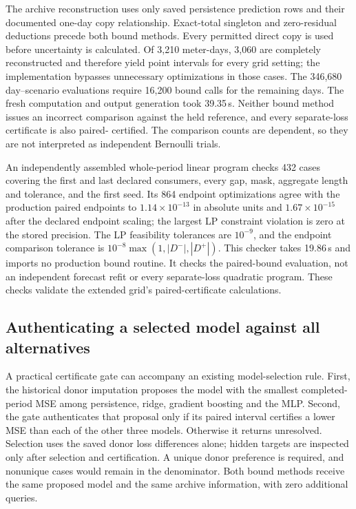 The archive reconstruction uses only saved persistence prediction rows and
their documented one-day copy relationship. Exact-total singleton and
zero-residual deductions precede both bound methods. Every permitted direct
copy is used before uncertainty is calculated. Of 3,210 meter-days, 3,060
are completely reconstructed and therefore yield point intervals for every
grid setting; the implementation bypasses unnecessary optimizations in
those cases. The 346,680 day--scenario evaluations require 16,200 bound
calls for the remaining days. The fresh computation and output generation
took 39.35\,s. Neither bound method issues an incorrect comparison against
the held reference, and every separate-loss certificate is also paired-
certified. The comparison counts are dependent, so they are not interpreted
as independent Bernoulli trials.

An independently assembled whole-period linear program checks 432 cases
covering the first and last declared consumers, every gap, mask, aggregate
length and tolerance, and the first seed. Its 864 endpoint optimizations
agree with the production paired endpoints to $1.14\times10^{-13}$ in
absolute units and $1.67\times10^{-15}$ after the declared endpoint scaling;
the largest LP constraint violation is zero at the stored precision.
The LP feasibility tolerances are $10^{-9}$, and the endpoint comparison
tolerance is $10^{-8}\max(1,|D^-|,|D^+|)$. This checker takes 19.86\,s and
imports no production bound routine. It checks the paired-bound evaluation,
not an independent forecast refit or every separate-loss quadratic program.
These checks validate the extended grid's paired-certificate calculations.
\subsection{Authenticating a selected model against all alternatives}
\label{sec:practical-model-selection}
A practical certificate gate can accompany an existing model-selection
rule. First, the historical donor imputation proposes the model with the
smallest completed-period MSE among persistence, ridge, gradient boosting
and the MLP. Second, the gate authenticates that proposal only if its
paired interval certifies a lower MSE than each of the other three models.
Otherwise it returns unresolved. Selection uses the saved donor loss
differences alone; hidden targets are inspected only after selection and
certification. A unique donor preference is required, and nonunique cases
would remain in the denominator. Both bound methods receive the same
proposed model and the same archive information, with zero additional
queries.

